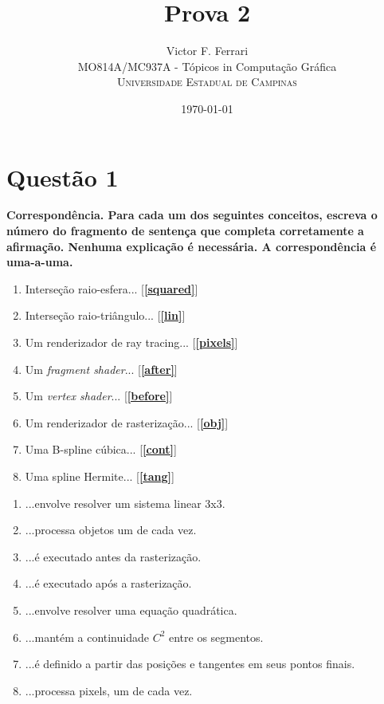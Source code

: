 \documentclass[12pt]{exam}
\title{Prova 2} %
\author{Victor F. Ferrari\\ %
MO814A/MC937A - Tópicos in Computação Gráfica\\ %
\textsc{Universidade Estadual de Campinas}
}
\date{\today} %
\begin{document}
\setlength{\droptitle}{-5em}    
\maketitle


\section*{Questão 1}
{\bfseries Correspondência. Para cada um dos seguintes conceitos, escreva o número do fragmento de sentença que completa corretamente a afirmação. Nenhuma explicação é necessária. A correspondência é uma-a-uma.}

\begin{enumerate}[label=\alph*)]
    \item Interseção raio-esfera... [\textbf{\ref{squared}}]
    \item Interseção raio-triângulo... [\textbf{\ref{lin}}]
    \item Um renderizador de ray tracing... [\textbf{\ref{pixels}}]
    \item Um \textit{fragment shader}... [\textbf{\ref{after}}]
    \item Um \textit{vertex shader}... [\textbf{\ref{before}}]
    \item Um renderizador de rasterização... [\textbf{\ref{obj}}]
    \item Uma B-spline cúbica... [\textbf{\ref{cont}}]
    \item Uma spline Hermite... [\textbf{\ref{tang}}]
\end{enumerate}

\begin{enumerate}
    \item ...envolve resolver um sistema linear 3x3. \label{lin}
    \item ...processa objetos um de cada vez. \label{obj}
    \item ...é executado antes da rasterização. \label{before}
    \item ...é executado após a rasterização. \label{after}
    \item ...envolve resolver uma equação quadrática. \label{squared}
    \item ...mantém a continuidade $C^2$ entre os segmentos. \label{cont}
    \item ...é definido a partir das posições e tangentes em seus pontos finais. \label{tang}
    \item ...processa pixels, um de cada vez. \label{pixels}
\end{enumerate}
\end{document}
